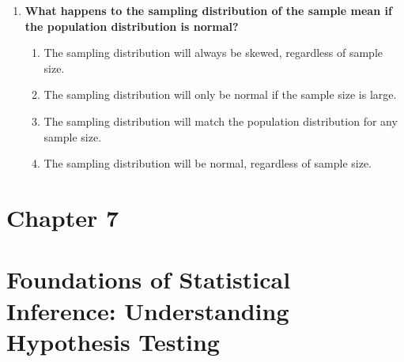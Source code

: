 \documentclass[
  letterpaper,
  DIV=11,
  numbers=noendperiod]{scrreprt}
\begin{document}
\begin{enumerate}
  \begin{enumerate}
  \def\labelenumii{\alph{enumii}.}
  \item
    It is the variability of individual data points and is equal to the
    population standard deviation.
  \item
    It is the standard deviation of the sampling distribution of sample
    means, calculated by dividing the sample standard deviation by the
    square root of the sample size.
  \item
    It measures the deviation of a single data point from the sample
    mean, using the formula SD/n.~
  \item
    It is a fixed value representing the population variance.
  \end{enumerate}
\item
  \textbf{What happens to the sampling distribution of the sample mean
  if the population distribution is normal?}

  \begin{enumerate}
  \def\labelenumii{\alph{enumii}.}
  \item
    The sampling distribution will always be skewed, regardless of
    sample size.
  \item
    The sampling distribution will only be normal if the sample size is
    large.
  \item
    The sampling distribution will match the population distribution for
    any sample size.
  \item
    The sampling distribution will be normal, regardless of sample size.
  \end{enumerate}
\end{enumerate}


\chapter{Chapter 7}\label{chapter-7}


\chapter*{Foundations of Statistical Inference: Understanding Hypothesis
Testing}\label{foundations-of-statistical-inference-understanding-hypothesis-testing}
\end{document}
